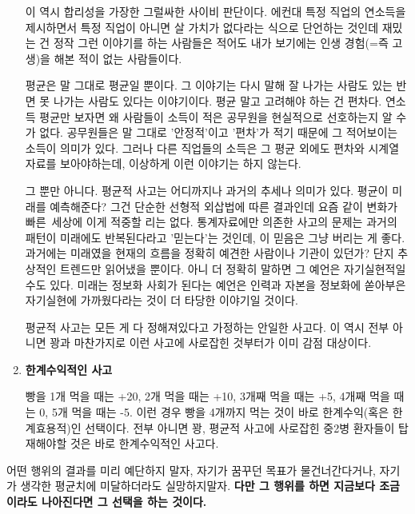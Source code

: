 \begin{enumerate}
    이 역시 합리성을 가장한 그럴싸한 사이비 판단이다.
    에컨대 특정 직업의 연소득을 제시하면서 특정 직업이 아니면 살 가치가 없다라는 식으로 단언하는 것인데
    재밌는 건 정작 그런 이야기를 하는 사람들은 적어도 내가 보기에는 인생 경험(=즉 고생)을 해본 적이 없는 사람들이다.
    \vspace{5mm}

    평균은 말 그대로 평균일 뿐이다. 그 이야기는 다시 말해 잘 나가는 사람도 있는 반면 못 나가는 사람도 있다는 이야기이다.
    평균 말고 고려해야 하는 건 편차다. 연소득 평균만 보자면 왜 사람들이 소득이 적은 공무원을 현실적으로 선호하는지 알 수가 없다.
    공무원들은 말 그대로 '안정적'이고 '편차'가 적기 때문에 그 적어보이는 소득이 의미가 있다.
    그러나 다른 직업들의 소득은 그 평균 외에도 편차와 시계열 자료를 보아야하는데, 이상하게 이런 이야기는 하지 않는다.
    \vspace{5mm}

    그 뿐만 아니다. 평균적 사고는 어디까지나 과거의 추세나 의미가 있다. 평균이 미래를 예측해준다?
    그건 단순한 선형적 외삽법에 따른 결과인데 요즘 같이 변화가 빠른 세상에 이게 적중할 리는 없다.
    통계자료에만 의존한 사고의 문제는 과거의 패턴이 미래에도 반복된다라고 '믿는다'는 것인데, 이 믿음은 그냥 버리는 게 좋다.
    과거에는 미래였을 현재의 흐름을 정확히 예견한 사람이나 기관이 있던가? 단지 추상적인 트렌드만 읽어냈을 뿐이다.
    아니 더 정확히 말하면 그 예언은 자기실현적일 수도 있다.
    미래는 정보화 사회가 된다는 예언은 인력과 자본을 정보화에 쏟아부은 자기실현에 가까웠다라는 것이 더 타당한 이야기일 것이다.
    \vspace{5mm}

    평균적 사고는 모든 게 다 정해져있다고 가정하는 안일한 사고다.
    이 역시 전부 아니면 꽝과 마찬가지로 이런 사고에 사로잡힌 것부터가 이미 감점 대상이다.
    \vspace{5mm}

    \item \textbf{ 한계수익적인 사고}
    \vspace{5mm}

    빵을 1개 먹을 때는 +20, 2개 먹을 때는 +10, 3개째 먹을 때는 +5, 4개째 먹을 때는 0, 5개 먹을 때는 -5.
    이런 경우 빵을 4개까지 먹는 것이 바로 한계수익(혹은 한계효용적)인 선택이다.
    전부 아니면 꽝, 평균적 사고에 사로잡힌 중2병 환자들이 탑재해야할 것은 바로 한계수익적인 사고다.
    \vspace{5mm}

\end{enumerate}
어떤 행위의 결과를 미리 예단하지 말자, 자기가 꿈꾸던 목표가 물건너간다거나, 자기가 생각한 평균치에 미달하더라도 실망하지말자.
\textbf{다만 그 행위를 하면 지금보다 조금이라도 나아진다면 그 선택을 하는 것이다.}
\vspace{5mm}


